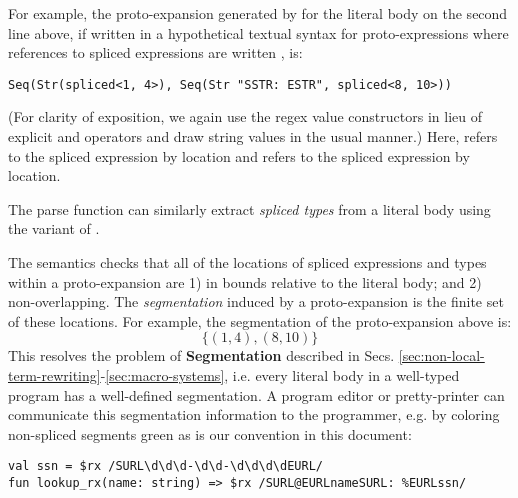 For example, the proto-expansion generated by  for the literal body on the second line above, if written in a hypothetical textual syntax for proto-expressions where references to spliced expressions are written , is:
\begin{lstlisting}[numbers=none]
Seq(Str(spliced<1, 4>), Seq(Str "SSTR: ESTR", spliced<8, 10>))
\end{lstlisting}
(For clarity of exposition, we again use the regex value constructors in lieu of explicit  and  operators and draw string values in the usual manner.) Here,  refers to the spliced expression  by location and  refers to the spliced expression  by location. 

The parse function can similarly extract \emph{spliced types} from a literal body using the  variant of . %


The semantics checks that all of the locations of spliced expressions and types within a proto-expansion are 1) in bounds relative to the literal body; and 2) non-overlapping. The \emph{segmentation} induced by a proto-expansion is the finite set of these locations. For example, the segmentation of the proto-expansion above is:
\[\{(1, 4), (8, 10)\}\]
This resolves the problem of \textbf{Segmentation} described in Secs. \ref{sec:non-local-term-rewriting}-\ref{sec:macro-systems}, i.e. every literal body in a well-typed program has a well-defined segmentation. A program editor or pretty-printer can communicate this segmentation information to the programmer, e.g. by coloring non-spliced segments green as is our convention in this document:
\begin{lstlisting}[numbers=none]
val ssn = $rx /SURL\d\d\d-\d\d-\d\d\d\dEURL/
fun lookup_rx(name: string) => $rx /SURL@EURLnameSURL: %EURLssn/ 
\end{lstlisting}

